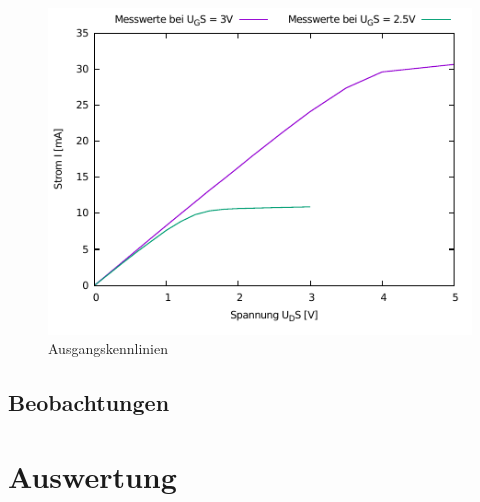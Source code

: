 \documentclass[11pt, a4paper]{article}
\begin{document}
\begin{figure}
    \centering
    \includegraphics[width=\linewidth]{ausgang.pdf}
    \caption{Ausgangskennlinien}
    \label{graphAusgangskennlinie}
\end{figure}
\subsection*{Beobachtungen}
\section*{Auswertung}
\end{document}
